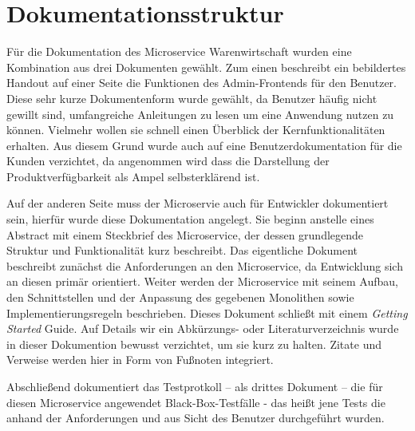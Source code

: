 \section{Dokumentationsstruktur}
\label{sec: Dokumentationsstruktur}

Für die Dokumentation des Microservice Warenwirtschaft wurden eine Kombination aus drei Dokumenten gewählt. Zum einen beschreibt ein bebildertes Handout auf einer Seite die Funktionen des Admin-Frontends für den Benutzer. Diese sehr kurze Dokumentenform wurde gewählt, da Benutzer häufig nicht gewillt sind, umfangreiche Anleitungen zu lesen um eine Anwendung nutzen zu können. Vielmehr wollen sie schnell einen Überblick der Kernfunktionalitäten erhalten. Aus diesem Grund wurde auch auf eine Benutzerdokumentation für die Kunden verzichtet, da angenommen wird dass die Darstellung der Produktverfügbarkeit als Ampel selbsterklärend ist.\par 
Auf der anderen Seite muss der Microservie auch für Entwickler dokumentiert sein, hierfür wurde diese Dokumentation angelegt. Sie beginn anstelle eines Abstract mit einem Steckbrief des Microservice, der dessen grundlegende Struktur und Funktionalität kurz beschreibt. Das eigentliche Dokument beschreibt zunächst die Anforderungen an den Microservice, da Entwicklung sich an diesen primär orientiert. Weiter werden der Microservice mit seinem Aufbau, den Schnittstellen und der Anpassung des gegebenen Monolithen sowie Implementierungsregeln beschrieben. Dieses Dokument schließt mit einem \textit{Getting Started} Guide. Auf Details wir ein Abkürzungs- oder Literaturverzeichnis wurde in dieser Dokumention bewusst verzichtet, um sie kurz zu halten. Zitate und Verweise werden hier in Form von Fußnoten integriert.\par 
Abschließend dokumentiert das Testprotkoll -- als drittes Dokument -- die für diesen Microservice angewendet Black-Box-Testfälle - das heißt jene Tests die anhand der Anforderungen und aus Sicht des Benutzer durchgeführt wurden.